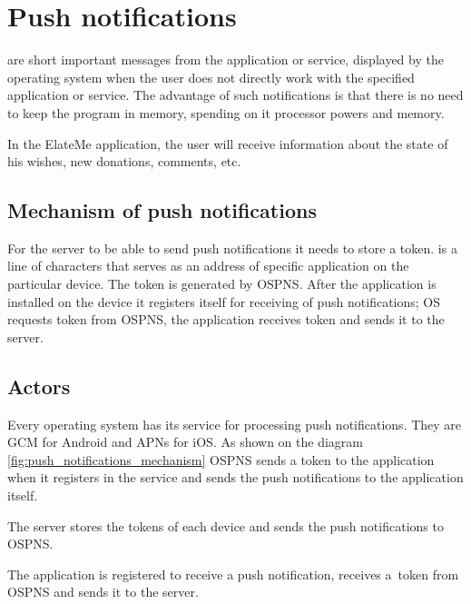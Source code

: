 \section{Push notifications}
 are short important messages from the application or service, displayed by the operating
system when the user does not directly work with the specified application or service. The advantage of such
notifications is that there is no need to keep the program in memory, spending on it processor powers and memory.

In the ElateMe application, the user will receive information about the state of his wishes, new donations, comments,
etc.

\subsection{Mechanism of push notifications}
For the server to be able to send push notifications it needs to store a token.  is a line of
characters that serves as an address of specific application on the particular device. The token is generated by
\ac{OSPNS}. After the application is installed on the device it registers itself for receiving of push notifications;
OS requests token from \ac{OSPNS}, the application receives token and sends it to the server.


\subsection{Actors}

\begin{itemize}
Every operating system has its service for processing push notifications. They are \ac{GCM} for Android and \ac{APNs}
for iOS. As shown on the diagram \ref{fig:push_notifications_mechanism} OSPNS sends a token to the application when it
registers in the service and sends the push notifications to the application itself.

The server stores the tokens of each device and sends the push notifications to OSPNS.

The application is registered to receive a push notification, receives a~token from OSPNS and sends it to the server.
\end{itemize}






